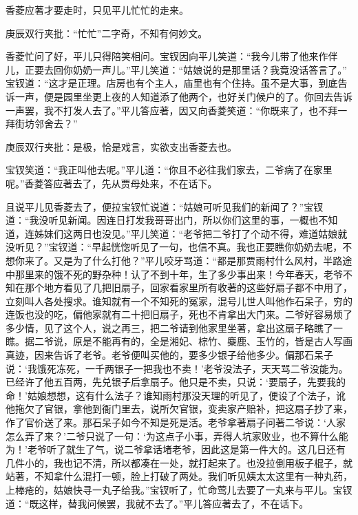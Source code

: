 \begin{parag}
    香菱应著才要走时，只见平儿忙忙的走来。\begin{note}庚辰双行夹批：“忙忙”二字奇，不知有何妙文。\end{note}香菱忙问了好，平儿只得陪笑相问。宝钗因向平儿笑道：“我今儿带了他来作伴儿，正要去回你奶奶一声儿。”平儿笑道：“姑娘说的是那里话？我竟没话答言了。” 宝钗道：“这才是正理。店房也有个主人，庙里也有个住持。虽不是大事，到底告诉一声，便是园里坐更上夜的人知道添了他两个，也好关门候户的了。你回去告诉一声罢，我不打发人去了。”平儿答应著，因又向香菱笑道：“你既来了，也不拜一拜街坊邻舍去？”\begin{note}庚辰双行夹批：是极，恰是戏言，实欲支出香菱去也。\end{note}宝钗笑道：“我正叫他去呢。”平儿道：“你且不必往我们家去，二爷病了在家里呢。”香菱答应著去了，先从贾母处来，不在话下。
\end{parag}


\begin{parag}
    且说平儿见香菱去了，便拉宝钗忙说道：“姑娘可听见我们的新闻了？”宝钗道：“我没听见新闻。因连日打发我哥哥出门，所以你们这里的事，一概也不知道，连姊妹们这两日也没见。”平儿笑道：“老爷把二爷打了个动不得，难道姑娘就没听见？”宝钗道：“早起恍惚听见了一句，也信不真。我也正要瞧你奶奶去呢，不想你来了。又是为了什么打他？”平儿咬牙骂道：“都是那贾雨村什么风村，半路途中那里来的饿不死的野杂种！认了不到十年，生了多少事出来！今年春天，老爷不知在那个地方看见了几把旧扇子，回家看家里所有收著的这些好扇子都不中用了，立刻叫人各处搜求。谁知就有一个不知死的冤家，混号儿世人叫他作石呆子，穷的连饭也没的吃，偏他家就有二十把旧扇子，死也不肯拿出大门来。二爷好容易烦了多少情，见了这个人，说之再三，把二爷请到他家里坐著，拿出这扇子略瞧了一瞧。据二爷说，原是不能再有的，全是湘妃、棕竹、麋鹿、玉竹的，皆是古人写画真迹，因来告诉了老爷。老爷便叫买他的，要多少银子给他多少。偏那石呆子说：‘我饿死冻死，一千两银子一把我也不卖！’老爷没法子，天天骂二爷没能为。已经许了他五百两，先兑银子后拿扇子。他只是不卖，只说：‘要扇子，先要我的命！’姑娘想想，这有什么法子？谁知雨村那没天理的听见了，便设了个法子，讹他拖欠了官银，拿他到衙门里去，说所欠官银，变卖家产赔补，把这扇子抄了来，作了官价送了来。那石呆子如今不知是死是活。老爷拿著扇子问著二爷说：‘人家怎么弄了来？’二爷只说了一句：‘为这点子小事，弄得人坑家败业，也不算什么能为！’老爷听了就生了气，说二爷拿话堵老爷，因此这是第一件大的。这几日还有几件小的，我也记不清，所以都凑在一处，就打起来了。也没拉倒用板子棍子，就站著，不知拿什么混打一顿，脸上打破了两处。我们听见姨太太这里有一种丸药，上棒疮的，姑娘快寻一丸子给我。”宝钗听了，忙命莺儿去要了一丸来与平儿。宝钗道：“既这样，替我问候罢，我就不去了。”平儿答应著去了，不在话下。
\end{parag}


